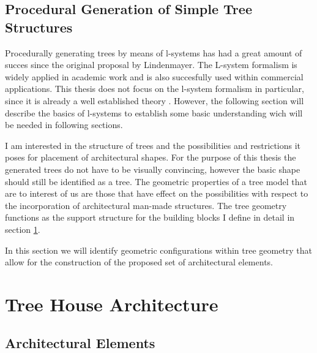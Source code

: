 \documentclass{article}
\begin{document}
\subsection{Procedural Generation of Simple Tree Structures}

Procedurally generating trees by means of l-systems has had a great amount of succes since the original proposal by Lindenmayer. The L-system formalism is widely applied in  academic work and is also succesfully used within commercial applications. This thesis does not focus on the l-system formalism in particular, since it is already a well established theory \cite{PrzemyslawAlgoBeauty}. However, the following section will describe the basics of l-systems to establish some basic understanding wich will be needed in following sections. 


I am interested in the structure of trees and the possibilities and restrictions it poses for placement of 
architectural shapes. For the purpose of this thesis the generated trees do not have to be visually convincing, 
however the basic shape should still be identified as a tree. The geometric properties of a tree model that are to interest of us are those that have effect on the possibilities with respect to the incorporation of architectural man-made structures. The tree geometry functions as the support structure for the building blocks I define in detail in section \ref{sec:treehousearch}. 

In this section we will identify geometric configurations within tree geometry that allow for the construction of the proposed set of architectural elements.    

%   
%
%




\section{Tree House Architecture}
\label{sec:treehousearch}
 





\subsection{Architectural Elements} 
\label{sec:archelements}
 

\end{document}
